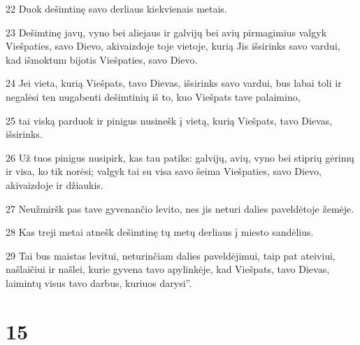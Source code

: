 \par 22 Duok dešimtinę savo derliaus kiekvienais metais. 
\par 23 Dešimtinę javų, vyno bei aliejaus ir galvijų bei avių pirmagimius valgyk Viešpaties, savo Dievo, akivaizdoje toje vietoje, kurią Jis išsirinks savo vardui, kad išmoktum bijotis Viešpaties, savo Dievo. 
\par 24 Jei vieta, kurią Viešpats, tavo Dievas, išsirinks savo vardui, bus labai toli ir negalėsi ten nugabenti dešimtinių iš to, kuo Viešpats tave palaimino, 
\par 25 tai viską parduok ir pinigus nusinešk į vietą, kurią Viešpats, tavo Dievas, išsirinks. 
\par 26 Už tuos pinigus nusipirk, kas tau patiks: galvijų, avių, vyno bei stiprių gėrimų ir visa, ko tik norėsi; valgyk tai su visa savo šeima Viešpaties, savo Dievo, akivaizdoje ir džiaukis. 
\par 27 Neužmiršk pas tave gyvenančio levito, nes jis neturi dalies paveldėtoje žemėje. 
\par 28 Kas treji metai atnešk dešimtinę tų metų derliaus į miesto sandėlius. 
\par 29 Tai bus maistas levitui, neturinčiam dalies paveldėjimui, taip pat ateiviui, našlaičiui ir našlei, kurie gyvena tavo apylinkėje, kad Viešpats, tavo Dievas, laimintų visus tavo darbus, kuriuos darysi”.



\chapter{15}

